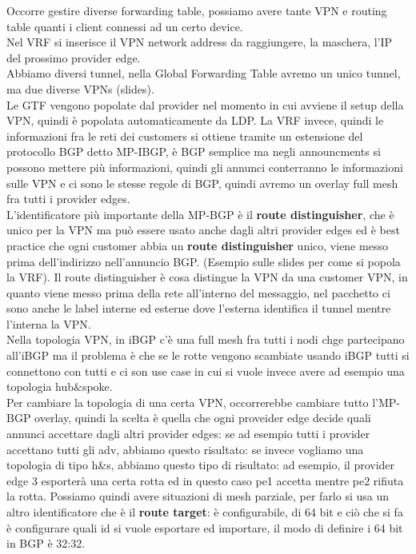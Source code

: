 \documentclass[12pt, oneside]{extbook} %
\begin{document}
Occorre gestire diverse forwarding table, possiamo avere tante VPN e routing table quanti i client connessi ad un certo device.\\Nel VRF si inserisce il VPN network address da raggiungere, la maschera, l'IP del prossimo provider edge.\\Abbiamo diversi tunnel, nella Global Forwarding Table avremo un unico tunnel, ma due diverse VPNs (slides).\\Le GTF vengono popolate dal provider nel momento in cui avviene il setup della VPN, quindi è popolata automaticamente da LDP. La VRF invece, quindi le informazioni fra le reti dei customers si ottiene tramite un estensione del protocollo BGP detto MP-IBGP, è BGP semplice ma negli announcments si possono mettere più informazioni, quindi gli annunci conterranno le informazioni sulle VPN e ci sono le stesse regole di BGP, quindi avremo un overlay full mesh fra tutti i provider edges.\\L'identificatore più importante della MP-BGP è il \textbf{route distinguisher}, che è unico per la VPN ma può essere usato anche dagli altri provider edges ed è best practice che ogni customer abbia un \textbf{route distinguisher} unico, viene messo prima dell'indirizzo nell'annuncio BGP. (Esempio sulle slides per come si popola la VRF).
Il route distinguisher è cosa distingue la VPN da una customer VPN, in quanto viene messo prima della rete all'interno del messaggio, nel pacchetto ci sono anche le label interne ed esterne dove l'esterna identifica il tunnel mentre l'interna la VPN.\\Nella topologia VPN, in iBGP c'è una full mesh fra tutti i nodi chge partecipano all'iBGP ma il problema è che se le rotte vengono scambiate usando iBGP tutti si connettono con tutti e ci son use case in cui si vuole invece avere ad esempio una topologia hub\&spoke.\\Per cambiare la topologia di una certa VPN, occorrerebbe cambiare tutto l'MP-BGP overlay, quindi la scelta è quella che ogni proveider edge decide quali annunci accettare dagli altri provider edges: se ad esempio tutti i provider accettano tutti gli adv, abbiamo questo risultato:
se invece vogliamo una topologia di tipo h\&s, abbiamo questo tipo di risultato:
ad esempio, il provider edge 3 esporterà una certa rotta ed in questo caso pe1 accetta mentre pe2 rifiuta la rotta. Possiamo quindi avere situazioni di mesh parziale, per farlo si usa un altro identificatore che è il \textbf{route target}: è configurabile, di 64 bit e ciò che si fa è configurare quali id si vuole esportare ed importare, il modo di definire i 64 bit in BGP è 32:32.
\end{document}
